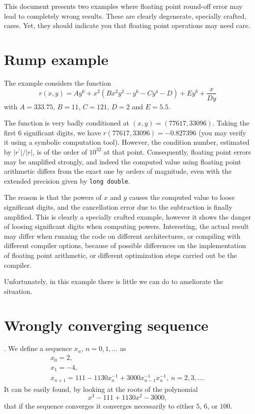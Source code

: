 \documentclass{article}
\begin{document}
This document presents two examples where floating point round-off error may lead to completely wrong results. These are clearly degenerate, specially crafted,  cases. Yet, they should indicate you that floating point operations may need care.

\section{Rump example}
The example considers the function
\[
  r(x,y)=Ay^6+x^2(Bx^2y^2-y^6-Cy^4-D)+Ey^8+\frac{x}{Dy}
\]
 with
  $A=333.75$, $B=11$, $C=121$, $D=2$ and $E=5.5$.
  
  The function is very badly conditioned at $(x,y)=(77617,33096)$.
  Taking the first $6$ significant digits, we have
  $r(77617,33096)=-0.827396$ (you may verify it using a symbolic
  computation tool). However, the condition number, estimated by
  $\vert r^\prime\vert/\vert r\vert$, is of the order of $10^{32}$ at
  that point. Consequently, floating point errors may be amplified
  strongly, and indeed the computed value using floating point
  arithmetic differs from the exact one by orders of magnitude, even
  with the extended precision given by \texttt{long double}.

  The reason is that the powers of $x$ and $y$ causes the computed
  value to loose significant digits, and the cancellation error due to
  the subtraction is finally amplified. This is clearly a specially
  crafted example, however it shows the danger of loosing significant
  digits when computing powers. Interesting, the actual result may
  differ when running the code on different architectures, or
  compiling with different compiler options, because of possible differences
  on the implementation of floating point arithmetic, or different
  optimization steps carried out be the compiler.

  Unfortunately, in this example there is little we can do to
  ameliorate the situation. 
  
\section{Wrongly converging sequence}.
We define a sequence $x_n,\, n=0,1,\ldots$ as
\[
  \begin{array}{l}
    x_0=2,\\
    x_1=-4,\\
    x_{n+1}=111-1130x_n^{-1}+3000x^{-1}_{n-1}x^{-1}_{n},\ n=2,3,\ldots.
  \end{array}
\]
    It can be easily found, by looking at the roots of the polynomial
    \[
    x^3-111+1130x^2-3000,
    \]
    that if the sequence converges it converges necessarily to either
    $5$, $6$, or $100$.
    
\end{document}
